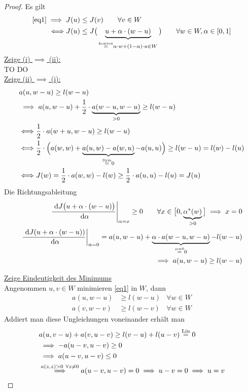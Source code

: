 \documentclass[12pt,a4paper]{article}
\begin{document}
\begin{proof}
Es gilt
\begin{align*}
\eqref{eq1}\implies
J(u)&\leq J(v)\qquad\forall v\in W\\
\Longleftrightarrow
J(u)&\leq J\big(\underbrace{u+\alpha\cdot(w-u)}_{\stackrel{\text{konvex}}{=}\alpha\cdot w+(1-\alpha)\cdot u\in W}\big)\qquad\forall w\in W,\alpha\in[0,1]
\end{align*}
\underline{Zeige (i) $\implies$ (ii):}\\
TO DO\\

\underline{Zeige (ii) $\implies$ (i):}
\begin{align*}
&a(u,w-u)\geq l(w-u)\\
&\implies
a(u,w-u)+\frac{1}{2}\cdot\underbrace{a(w-u,w-u)}_{>0}\geq l(w-u)\\
&\Longleftrightarrow
\frac{1}{2}\cdot a(w+u,w-u)\geq l(w-u)\\
&\Longleftrightarrow
\frac{1}{2}\cdot\Big(a(w,w)+\underbrace{a(u,w)-a(w,u)}_{\stackrel{\text{Sym}}{=}0}-a(u,u)\Big)\geq l(w-u)=l(w)-l(u)\\
&\Longleftrightarrow
J(w)=\frac{1}{2}\cdot a(w,w)-l(w)\geq\frac{1}{2}\cdot a(u,u)-l(u)=J(u)
\end{align*}
Die Richtungsableitung
\begin{align*}
\left.\frac{\text{ d} J\big(u+\alpha\cdot (w-u)\big)}{\text{ d}\alpha}\right|_{\alpha=x}\geq0\qquad\forall x\in\big[0,\underbrace{\alpha^\ast(w)}_{>0}\big]\implies x=0\\
\left.\frac{\text{ d} J(u+\alpha\cdot(w-u))}{\text{ d}\alpha}\right|_{\alpha=0}
=a(u,w-u)+\underbrace{\alpha\cdot a(w-u,w-u)}_{\stackrel{\alpha=0}{=}0}-l(w-u)\\
\implies a(u,w-u)\geq l(w-u)
\end{align*}

\underline{Zeige Eindeutigkeit des Minimums}\\
Angenommen $u,v\in W$ minimieren \eqref{eq1} in $W$, dann
\begin{align*}
a(u,w-u)&\geq l(w-u) &\forall w\in W\\
a(v,w-v)&\geq l(w-v) &\forall w\in W
\end{align*}
Addiert man diese Ungleichungen voneinander erhält man
\begin{align*}
&a(u,v-u)+a(v,u-v)\geq l(v-u)+l(u-v)\stackrel{\text{Lin}}{=}0\\
&\implies -a(u-v,u-v)\geq0\\
&\implies a(u-v,u-v)\leq 0\\
&\stackrel{a(z,z)>0~\forall z\neq0}{\implies}
a(u-v,u-v)=0\implies u-v=0\implies u=v
\end{align*}

\end{proof}
\end{document}
